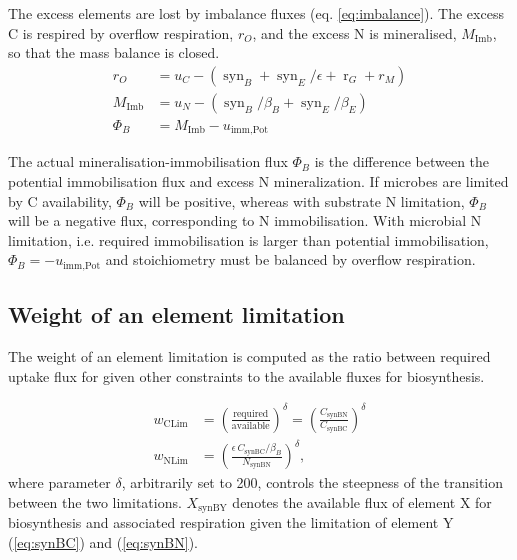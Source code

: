 The excess elements are lost by imbalance fluxes (eq. \ref{eq:imbalance}).
The excess C is respired by overflow respiration, $r_O$, and the excess
N is mineralised, $M_{\operatorname{Imb}}$, so that the mass
balance is closed.
\begin{subequations}
\label{eq:imbalance}
\begin{align}
r_O &= u_C - (\operatorname{syn}_B + \operatorname{syn}_E /\epsilon  + 
\operatorname{r}_G + r_M )\\
M_{\operatorname{Imb}} &= u_N -
(\operatorname{syn}_{B}/\beta_B + \operatorname{syn}_E/\beta_E )
\\
\label{eq:PhiB}
\Phi_B &= M_{\operatorname{Imb}} - u_{\operatorname{imm,Pot}}  
\end{align} 
\end{subequations}

The actual mineralisation-immobilisation flux $\Phi_B$ is the difference between
the potential immobilisation flux and excess N mineralization.
If microbes are limited by C availability, $\Phi_B$ will be positive, whereas with 
substrate N limitation, $\Phi_B$ will be a negative flux, corresponding to
N immobilisation.
With microbial N limitation, i.e. required immobilisation is larger than
potential immobilisation, $\Phi_B = -u_{\operatorname{imm,Pot}}$ and
stoichiometry must be balanced by overflow respiration.

\subsection{Weight of an element limitation}

The weight of an element limitation is computed as the ratio between required
uptake flux for given other constraints to the available fluxes for
biosynthesis.
  
\begin{subequations}
\label{eq:weightsLim}
\begin{align}
w_{\operatorname{CLim}} &= \left( \frac{\text{required}}{\text{available}}
\right)^\delta 
= \left( \frac{ C_{\operatorname{synBN}} }{ C_{\operatorname{synBC}} }
\right)^\delta
\\
w_{\operatorname{NLim}} &= \left( \frac{ \epsilon \, C_{\operatorname{synBC}} /
\beta_B }{ N_{\operatorname{synBN}} } \right)^\delta
\text{,} 
\end{align}
\end{subequations}
where parameter $\delta$, arbitrarily set to 200, controls
the steepness of the transition between the two limitations.
$X_{\operatorname{synBY}}$ denotes the available flux of element X for
biosynthesis and associated respiration given the limitation of element Y
(\ref{eq:synBC}) and (\ref{eq:synBN}).


